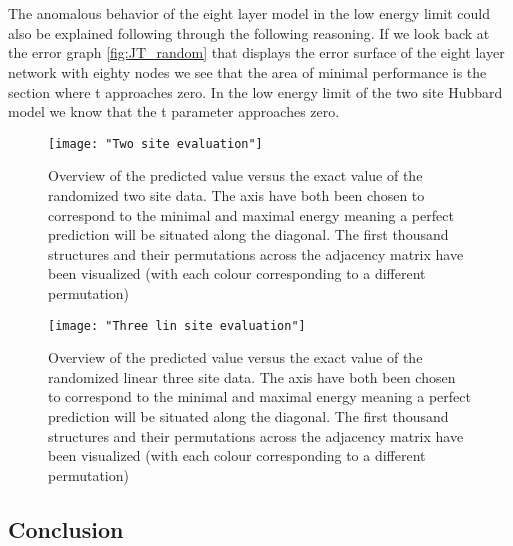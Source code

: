 \documentclass[12pt]{article}
\begin{document}
\\
\\
The anomalous behavior of the eight layer model in the low energy limit could also be explained following through the following reasoning. If we look back at the error graph \ref{fig:JT_random} that displays the error surface of the eight layer network with eighty nodes we see that the area of minimal performance is the section where t approaches zero. In the low energy limit of the two site Hubbard model we know that the t parameter approaches zero. 

\begin{figure}[H]
	\centering
	\texttt{[image: "Two site evaluation"]}
	\caption{Overview of the predicted value versus the exact value of the randomized  two site data. The axis have both been chosen to correspond to the minimal and maximal energy meaning a perfect prediction will be situated along the diagonal. The first thousand structures and their permutations across the adjacency matrix have been visualized (with each colour corresponding to a different permutation)}
	\label{fig:OStwo}
\end{figure}
\begin{figure}[H]
	\centering
	\texttt{[image: "Three lin site evaluation"]}
	\caption{Overview of the predicted value versus the exact value of the randomized  linear three site data. The axis have both been chosen to correspond to the minimal and maximal energy meaning a perfect prediction will be situated along the diagonal. The first thousand structures and their permutations across the adjacency matrix have been visualized (with each colour corresponding to a different permutation)}
	\label{fig:OSthree}
\end{figure}
\newpage
\subsection{Conclusion}
\end{document}
